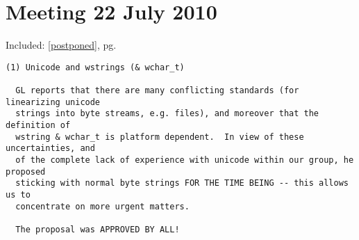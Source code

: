 \documentclass{book}[12,a4paper]
\def\refandpage#1{{\ref{#1}, pg.\pageref{#1}}}
\begin{document}
\section{Meeting  22 July 2010}

Included: \refandpage{postponed}
\begin{verbatim}
(1) Unicode and wstrings (& wchar_t)

  GL reports that there are many conflicting standards (for linearizing unicode
  strings into byte streams, e.g. files), and moreover that the definition of
  wstring & wchar_t is platform dependent.  In view of these uncertainties, and
  of the complete lack of experience with unicode within our group, he proposed
  sticking with normal byte strings FOR THE TIME BEING -- this allows us to
  concentrate on more urgent matters.

  The proposal was APPROVED BY ALL!
\end{verbatim}
\end{document}
